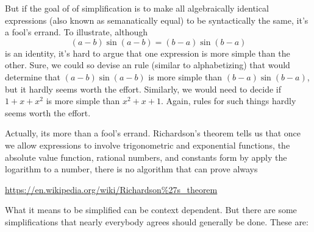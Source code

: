 \documentclass[12pt,fleqn]{article}
\begin{document}
But if the goal of of simplification is to make all algebraically
identical expressions (also known as semanatically equal) to be syntactically the same, it's a fool's 
errand. To illustrate, although
\begin{equation}
    (a-b) \sin(a-b) = (b-a) \sin(b-a)
\end{equation}
is an identity, it's hard to argue that one expression is more simple than
the other. Sure, we could so devise an rule (similar to alphabetizing) that
would determine that \((a-b) \sin(a-b)\) is more simple than \((b-a) \sin(b-a)\),
but it hardly seems worth the effort. Similarly, we would need to decide
if \(1+x+x^2\) is more simple than \(x^2 + x + 1\). Again, rules for
such things hardly seems worth the effort.

Actually, its more than a fool's errand. Richardson's theorem tells us
that once we allow expressions to involve trigonometric and exponential 
functions, the absolute value function, rational numbers, and constants form by apply the logarithm
to a number, there is no algorithm that can prove always

\url{https://en.wikipedia.org/wiki/Richardson%27s_theorem}


What it means to be 
simplified can be context dependent. But there are some simplifications that nearly 
everybody agrees should generally be done. These are:
\end{document}
